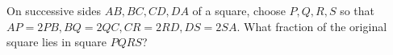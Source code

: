 On successive sides $AB,BC,CD,DA$ of a square, choose $P,Q,R,S$ so that $AP=2PB,BQ=2QC,CR=2RD,DS=2SA$. What fraction of the original square lies in square $PQRS$?
